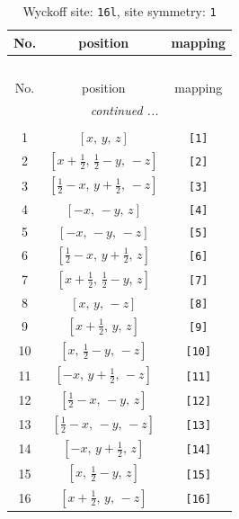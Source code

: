 \documentclass[fleqn,8pt]{jsarticle}
\begin{document}
\begin{longtable}{ccc}
\caption{Wyckoff site: {\tt 16l}, site symmetry: {\tt 1}}
 \\
 \hline \hline
No. & position & mapping \\ \hline \endfirsthead

\multicolumn{2}{l}{\tablename\ \thetable{}} \\
 \hline \hline
No. & position & mapping \\ \hline \endhead

 \hline \hline
\multicolumn{2}{r}{\footnotesize\it continued ...} \\ \endfoot

 \hline \hline
\multicolumn{2}{r}{} \\ \endlastfoot

1 & $\left[ x,\, y,\, z \right]$ & {\tt [1]} \\ \hline
2 & $\left[ x + \frac{1}{2},\, \frac{1}{2} - y,\, - z \right]$ & {\tt [2]} \\ \hline
3 & $\left[ \frac{1}{2} - x,\, y + \frac{1}{2},\, - z \right]$ & {\tt [3]} \\ \hline
4 & $\left[ - x,\, - y,\, z \right]$ & {\tt [4]} \\ \hline
5 & $\left[ - x,\, - y,\, - z \right]$ & {\tt [5]} \\ \hline
6 & $\left[ \frac{1}{2} - x,\, y + \frac{1}{2},\, z \right]$ & {\tt [6]} \\ \hline
7 & $\left[ x + \frac{1}{2},\, \frac{1}{2} - y,\, z \right]$ & {\tt [7]} \\ \hline
8 & $\left[ x,\, y,\, - z \right]$ & {\tt [8]} \\ \hline
9 & $\left[ x + \frac{1}{2},\, y,\, z \right]$ & {\tt [9]} \\ \hline
10 & $\left[ x,\, \frac{1}{2} - y,\, - z \right]$ & {\tt [10]} \\ \hline
11 & $\left[ - x,\, y + \frac{1}{2},\, - z \right]$ & {\tt [11]} \\ \hline
12 & $\left[ \frac{1}{2} - x,\, - y,\, z \right]$ & {\tt [12]} \\ \hline
13 & $\left[ \frac{1}{2} - x,\, - y,\, - z \right]$ & {\tt [13]} \\ \hline
14 & $\left[ - x,\, y + \frac{1}{2},\, z \right]$ & {\tt [14]} \\ \hline
15 & $\left[ x,\, \frac{1}{2} - y,\, z \right]$ & {\tt [15]} \\ \hline
16 & $\left[ x + \frac{1}{2},\, y,\, - z \right]$ & {\tt [16]} \\
\end{longtable}
\end{document}
